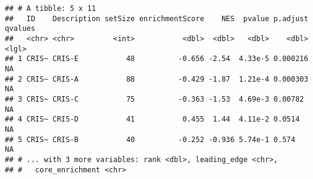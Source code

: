 \documentclass[
]{article}
\newenvironment{Shaded}{\begin{snugshade}}{\end{snugshade}}
\newcommand{\CommentTok}[1]{\textcolor[rgb]{0.56,0.35,0.01}{\textit{#1}}}
\newcommand{\DataTypeTok}[1]{\textcolor[rgb]{0.13,0.29,0.53}{#1}}
\newcommand{\DecValTok}[1]{\textcolor[rgb]{0.00,0.00,0.81}{#1}}
\newcommand{\FloatTok}[1]{\textcolor[rgb]{0.00,0.00,0.81}{#1}}
\newcommand{\KeywordTok}[1]{\textcolor[rgb]{0.13,0.29,0.53}{\textbf{#1}}}
\newcommand{\NormalTok}[1]{#1}
\newcommand{\OperatorTok}[1]{\textcolor[rgb]{0.81,0.36,0.00}{\textbf{#1}}}
\newcommand{\StringTok}[1]{\textcolor[rgb]{0.31,0.60,0.02}{#1}}
\begin{document}
\begin{Shaded}
\end{Shaded}

\begin{verbatim}
## # A tibble: 5 x 11
##   ID    Description setSize enrichmentScore    NES  pvalue p.adjust qvalues
##   <chr> <chr>         <int>           <dbl>  <dbl>   <dbl>    <dbl> <lgl>  
## 1 CRIS~ CRIS-E           48          -0.656 -2.54  4.33e-5 0.000216 NA     
## 2 CRIS~ CRIS-A           88          -0.429 -1.87  1.21e-4 0.000303 NA     
## 3 CRIS~ CRIS-C           75          -0.363 -1.53  4.69e-3 0.00782  NA     
## 4 CRIS~ CRIS-D           41           0.455  1.44  4.11e-2 0.0514   NA     
## 5 CRIS~ CRIS-B           40          -0.252 -0.936 5.74e-1 0.574    NA     
## # ... with 3 more variables: rank <dbl>, leading_edge <chr>,
## #   core_enrichment <chr>
\end{verbatim}
\end{document}
